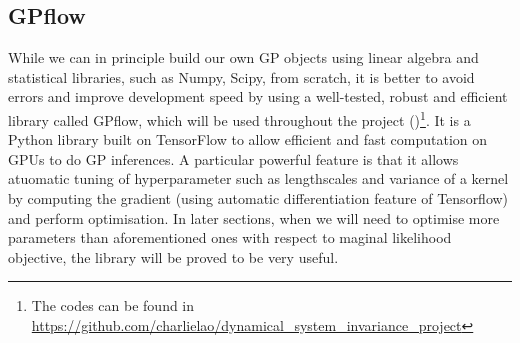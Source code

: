 \documentclass{statsmsc}
\begin{document}
\subsection{GPflow}
While we can in principle build our own GP objects using linear algebra and statistical libraries, such as Numpy, Scipy, from scratch, it is better to avoid errors and improve development speed by using a well-tested, robust and efficient library called GPflow, which will be used throughout the project (\cite{GPflow2017})\footnote[1]{The codes can be found in \url{https://github.com/charlielao/dynamical\_system\_invariance\_project}}.
It is a Python library built on TensorFlow to allow efficient and fast computation on GPUs to do GP inferences.
A particular powerful feature is that it allows atuomatic tuning of hyperparameter such as lengthscales and variance of a kernel by computing the gradient (using automatic differentiation feature of Tensorflow) and perform optimisation.
In later sections, when we will need to optimise more parameters than aforementioned ones with respect to maginal likelihood objective, the library will be proved to be very useful.
\end{document}
